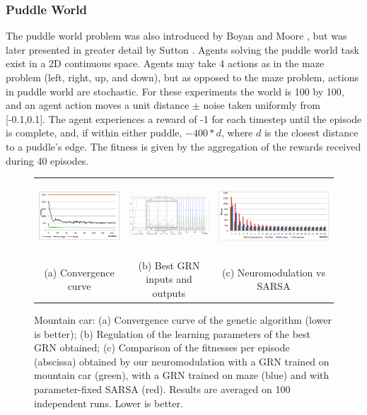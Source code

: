
\subsubsection{Puddle World}

The puddle world problem was also introduced by Boyan and Moore \cite{Boyan1995}, but was later presented in greater detail by Sutton \cite{sutton1996generalization}. Agents solving the puddle world task exist in a 2D continuous space. Agents may take 4 actions as in the maze problem (left, right, up, and down), but as opposed to the maze problem, actions in puddle world are stochastic. For these experiments the world is 100 by 100, and an agent action moves a unit distance $\pm$ noise taken uniformly from [-0.1,0.1]. The agent experiences a reward of -1 for each timestep until the episode is complete, and, if within either puddle, $-400*d$, where $d$ is the closest distance to a puddle's edge. The fitness is given by the aggregation of the rewards received during 40 episodes.


\begin{figure}[t!]
\center
\begin{tabular}{ccc}
\includegraphics[height=2.7cm]{MC_convergence.pdf} &
\includegraphics[height=2.7cm]{MC_GRNBehavior.pdf} &
\includegraphics[height=2.7cm]{MC_GRNvsSARSA.pdf}\\
(a) Convergence curve &
(b) Best GRN inputs and outputs &
(c) Neuromodulation vs SARSA
\end{tabular}
\caption{Mountain car: (a) Convergence curve of the genetic algorithm (lower is better); (b) Regulation of the learning parameters of the best GRN obtained; (c) Comparison of the fitnesses per episode (abscissa) obtained by our neuromodulation with a GRN trained on mountain car (green), with a GRN trained on maze (blue) and with parameter-fixed SARSA (red). Results are averaged on 100 independent runs. Lower is better.}\label{fig:MC:Results}
\end{figure}

